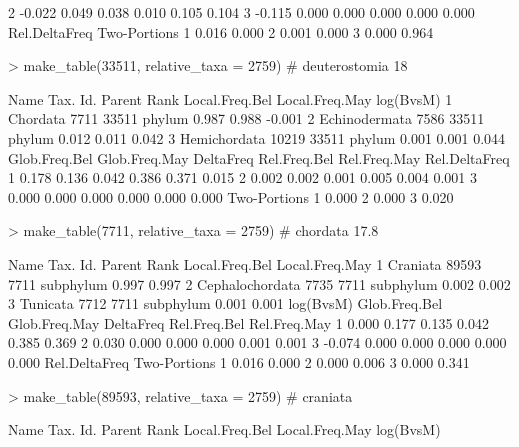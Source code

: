 \documentclass{article}
\begin{document}
\begin{Schunk}
\begin{Soutput}
2    -0.022         0.049         0.038     0.010        0.105        0.104
3    -0.115         0.000         0.000     0.000        0.000        0.000
  Rel.DeltaFreq Two-Portions
1         0.016        0.000
2         0.001        0.000
3         0.000        0.964
\end{Soutput}
\begin{Sinput}
> make_table(33511, relative_taxa = 2759) # deuterostomia    18% B and 13.8% M
\end{Sinput}
\begin{Soutput}
           Name Tax. Id. Parent   Rank Local.Freq.Bel Local.Freq.May log(BvsM)
1      Chordata     7711  33511 phylum          0.987          0.988    -0.001
2 Echinodermata     7586  33511 phylum          0.012          0.011     0.042
3  Hemichordata    10219  33511 phylum          0.001          0.001     0.044
  Glob.Freq.Bel Glob.Freq.May DeltaFreq Rel.Freq.Bel Rel.Freq.May Rel.DeltaFreq
1         0.178         0.136     0.042        0.386        0.371         0.015
2         0.002         0.002     0.001        0.005        0.004         0.001
3         0.000         0.000     0.000        0.000        0.000         0.000
  Two-Portions
1        0.000
2        0.000
3        0.020
\end{Soutput}
\begin{Sinput}
> make_table(7711, relative_taxa = 2759)  # chordata    17.8% 13.6%
\end{Sinput}
\begin{Soutput}
             Name Tax. Id. Parent      Rank Local.Freq.Bel Local.Freq.May
1        Craniata    89593   7711 subphylum          0.997          0.997
2 Cephalochordata     7735   7711 subphylum          0.002          0.002
3        Tunicata     7712   7711 subphylum          0.001          0.001
  log(BvsM) Glob.Freq.Bel Glob.Freq.May DeltaFreq Rel.Freq.Bel Rel.Freq.May
1     0.000         0.177         0.135     0.042        0.385        0.369
2     0.030         0.000         0.000     0.000        0.001        0.001
3    -0.074         0.000         0.000     0.000        0.000        0.000
  Rel.DeltaFreq Two-Portions
1         0.016        0.000
2         0.000        0.006
3         0.000        0.341
\end{Soutput}
\begin{Sinput}
> make_table(89593, relative_taxa = 2759) # craniata
\end{Sinput}
\begin{Soutput}
        Name Tax. Id. Parent    Rank Local.Freq.Bel Local.Freq.May log(BvsM)

\end{Soutput}
\end{Schunk}
\end{document}

